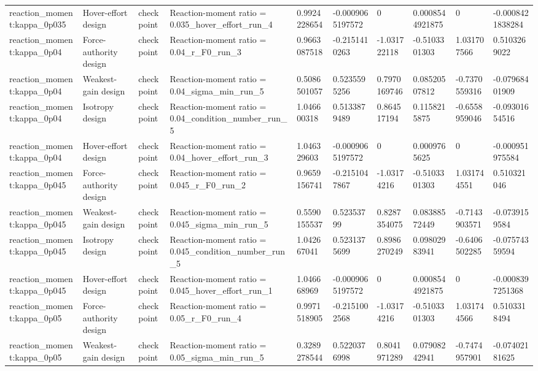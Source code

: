 \begin{tabular}{@{}llllllllll@{}}
reaction\_moment:kappa\_0p035 & Hover-effort design & checkpoint & Reaction-moment ratio = 0.035\_hover\_effort\_run\_4 & 0.9924228654 & -0.0009065197572 & 0 & 0.0008544921875 & 0 & -0.0008421838284 \\
reaction\_moment:kappa\_0p04 & Force-authority design & checkpoint & Reaction-moment ratio = 0.04\_r\_F0\_run\_3 & 0.9663087518 & -0.2151410263 & -1.031722118 & -0.5103301303 & 1.031707566 & 0.5103269022 \\
reaction\_moment:kappa\_0p04 & Weakest-gain design & checkpoint & Reaction-moment ratio = 0.04\_sigma\_min\_run\_5 & 0.5086501057 & 0.5235595256 & 0.7970169746 & 0.08520507812 & -0.7370559316 & -0.07968401909 \\
reaction\_moment:kappa\_0p04 & Isotropy design & checkpoint & Reaction-moment ratio = 0.04\_condition\_number\_run\_5 & 1.046600318 & 0.5133879489 & 0.864517194 & 0.1158215875 & -0.6558959046 & -0.09301654516 \\
reaction\_moment:kappa\_0p04 & Hover-effort design & checkpoint & Reaction-moment ratio = 0.04\_hover\_effort\_run\_3 & 1.046329603 & -0.0009065197572 & 0 & 0.0009765625 & 0 & -0.000951975584 \\
reaction\_moment:kappa\_0p045 & Force-authority design & checkpoint & Reaction-moment ratio = 0.045\_r\_F0\_run\_2 & 0.9659156741 & -0.2151047867 & -1.03174216 & -0.5103301303 & 1.031744551 & 0.510321046 \\
reaction\_moment:kappa\_0p045 & Weakest-gain design & checkpoint & Reaction-moment ratio = 0.045\_sigma\_min\_run\_5 & 0.5590155537 & 0.52353799 & 0.8287354075 & 0.08388572449 & -0.7143903571 & -0.0739159584 \\
reaction\_moment:kappa\_0p045 & Isotropy design & checkpoint & Reaction-moment ratio = 0.045\_condition\_number\_run\_5 & 1.042667041 & 0.5231375699 & 0.8986270249 & 0.09802983941 & -0.6406502285 & -0.07574359594 \\
reaction\_moment:kappa\_0p045 & Hover-effort design & checkpoint & Reaction-moment ratio = 0.045\_hover\_effort\_run\_1 & 1.046668969 & -0.0009065197572 & 0 & 0.0008544921875 & 0 & -0.0008397251368 \\
reaction\_moment:kappa\_0p05 & Force-authority design & checkpoint & Reaction-moment ratio = 0.05\_r\_F0\_run\_4 & 0.9971518905 & -0.2151002568 & -1.03174216 & -0.5103301303 & 1.031744566 & 0.5103318494 \\
reaction\_moment:kappa\_0p05 & Weakest-gain design & checkpoint & Reaction-moment ratio = 0.05\_sigma\_min\_run\_5 & 0.3289278544 & 0.5220376998 & 0.8041971289 & 0.07908242941 & -0.7474957901 & -0.07402181625 \\

\end{tabular}
